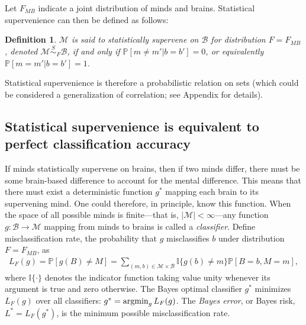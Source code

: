 \documentclass{article}
\newcommand{\argmin}{\operatornamewithlimits{argmin}}
\newcommand{\PP}{\mathbb{P}}
\newcommand{\II}{\mathbb{I}}           %
\newtheorem{defi}{Definition}
\providecommand{\mc}[1]{\mathcal{#1}}
\providecommand{\mh}[1]{\hat{#1}}
\newcommand{\mB}{\mathcal{B}}
\newcommand{\mM}{\mathcal{M}}
\newcommand{\MsB}{\mM \overset{S}{\sim}_{F} \mB}
\newcommand{\from}{\colon}
\begin{document}
Let $F_{MB}$ indicate a joint distribution of minds and brains. Statistical supervenience can then be defined as follows:
\begin{defi}
\label{def:1} 
$\mM$ is said to \textit{statistically supervene} on $\mB$ for distribution $F=F_{MB}$, denoted $\mM \overset{S}{\sim}_F \mB$, if and only if $\PP[m \neq m' | b=b']=0$, or equivalently $\PP[m = m' | b = b']=1$. 
\end{defi}
\noindent Statistical supervenience is therefore a probabilistic relation on sets (which could be considered a generalization of correlation; see Appendix for details).  



\subsection*{Statistical supervenience is equivalent to perfect classification accuracy} %
\label{sub:theoretical_results}

If minds statistically supervene on brains, 
then if two minds differ, there must be some brain-based difference to account for the mental difference.  This means that there must exist a deterministic function $g^*$ mapping each brain to its supervening mind. One could therefore, in principle, know this function. When the space of all possible minds is finite---that is, $|\mM| < \infty$---any function $g\from \mB \to \mM$ mapping from minds to brains is called a \emph{classifier}.  
Define misclassification rate, the probability that $g$ misclassifies $b$ under distribution $F=F_{MB}$,  as
\begin{align} \label{eq:1}
L_{F}(g) = \PP[g(B) \neq M] =  \sum_{(m,b) \in \mc{M} \times \mc{B}} \II\{g(b) \neq m\} \PP[B=b, M=m],	
\end{align}
where $\II\{\cdot\}$ denotes the indicator function taking value unity whenever its argument is true and zero otherwise.  The Bayes optimal classifier $g^*$ minimizes $L_{F}(g)$ over all classifiers:	
$g^* = \argmin_{g} L_{F}(g)$.
The \emph{Bayes error}, or Bayes risk, $L^*=L_{F}(g^*)$, is the minimum possible misclassification rate.
\end{document}
